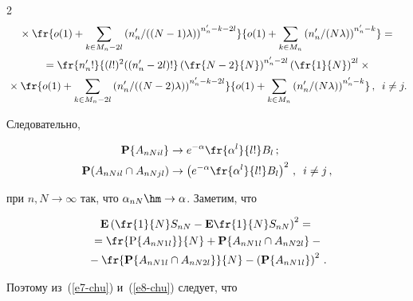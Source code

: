 \begin{multicols}{2}
\begin{multline*}
{}\times


\fr {o(1)+\sum\limits_{k\in M_n-2l}\left({n'_n}/{((N-1)\lambda)}\right)^{n'_n-k-2l}}{


o(1)+\sum\limits_{k\in M_n}\left({n'_n}/{(N\lambda)}\right)^{n'_n-k}} ={}\\[1pt]


{}


=\fr{n'_n!}{(l!)^2((n'_n-2l)!}\left(\fr{N-2}{N}\right)^{n'_n-2l}\left(\fr{1}{N}\right)^{2l}\times{}\\[1pt]


{}\times


\fr{o(1)+\sum\limits_{k\in M_n-2l}\left({n'_n}/{((N-2)\lambda)}\right)^{n'_n-k-2l}}{


o(1)+\sum\limits_{k\in M_n}\left({n'_n}/{(N\lambda)}\right)^{n'_n-k}}\,,\enskip i\ne j.


\end{multline*}


Следовательно,


\begin{align}


\mathbf{P}\{A_{nNil}\} &\to e^{-\alpha}\fr{\alpha^l}{l!}B_l \,;


\label{e7-chu}\\


\mathbf{P}(A_{nNil}\cap


A_{nNjl})&\to\left(e^{-\alpha}\fr{\alpha^l}{l!}B_l\right)^2\,,\enskip i\ne j\,, 


\label{e8-chu}


\end{align}


при $n, N\to\infty$ так, что $\alpha_{nN}\hm\to\alpha$. Заметим, что


\begin{multline*}


\mathbf{E}\left(\fr{1}{N}S_{nN}-\mathbf{E}\fr{1}{N}S_{nN}\right)^2={}\\


{}=


\fr{\mathrm{P}\{A_{nN1l}\}}{N}+\mathbf{P}\{A_{nN1l}\cap A_{nN2l}\}-{}\\


{}-\fr{\mathbf{P}\{A_{nN1l}\cap


A_{nN2l}\}}{N}-\left(\mathbf{P}\{A_{nN1l}\}\right)^2\,.


\end{multline*}


Поэтому из~(\ref{e7-chu}) и~(\ref{e8-chu}) следует, что



\end{multicols}
